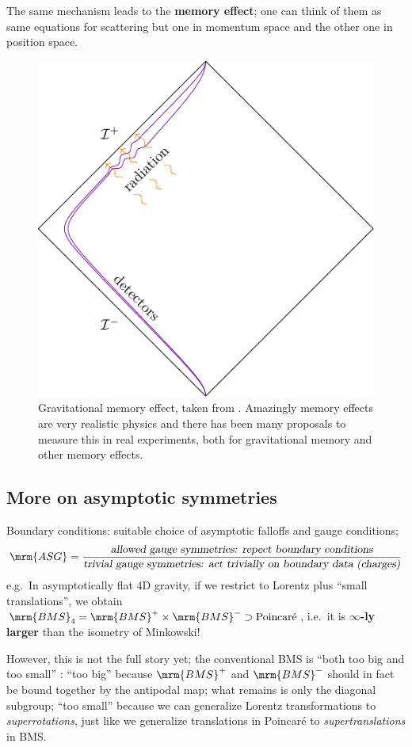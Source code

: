 \documentclass[a4paper
	,10pt
]{article}
\begin{document}
	The same mechanism leads to the \textbf{memory effect}; one can think of them as same equations for scattering but one in momentum space and the other one in position space. 
	
	\begin{figure}[!h]
	\centering
	\includegraphics[width=.45\linewidth]{img/memdet.pdf}
	\caption[Gravitational memory effect]{
		Gravitational memory effect, taken from \cite{Strominger:2017zoo}. Amazingly memory effects are very realistic physics and there has been many proposals to measure this in real experiments, both for gravitational memory and other memory effects.
	}
	\end{figure}
\subsection{More on asymptotic symmetries}
	
	Boundary conditions: suitable choice of asymptotic falloffs and gauge conditions; 
	\begin{equation}
		\mrm{ASG}
		= \frac{
			\textsl{allowed gauge symmetries: repect boundary conditions}
		}{
			\textsl{trivial gauge symmetries: act trivially on boundary data (charges)}
		}
	\end{equation}
	e.g.~In asymptotically flat 4D gravity, if we restrict to Lorentz plus ``small translations'', we obtain $\mrm{BMS}_4 = \mrm{BMS}^+ \times \mrm{BMS}^- \supset \text{Poincar\'e}$, i.e.~it is \textbf{$\infty$-ly larger} than the isometry of Minkowski!
	
	However, this is not the full story yet; the conventional BMS is ``both too big and too small'' \cite{Strominger:2017zoo}: ``too big'' because $\mrm{BMS}^+$ and $\mrm{BMS}^-$ should in fact be bound together by the antipodal map; what remains is only the diagonal subgroup; ``too small'' because we can generalize Lorentz transformations to \textit{superrotations}, just like we generalize translations in Poincar\'e to \textit{supertranslations} in BMS. 
	
\end{document}
